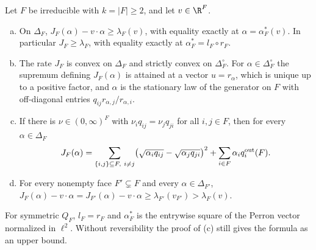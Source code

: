 \begin{proposition}\label{prop:rate}
Let $F$ be irreducible with $k=\lvert F\rvert\ge2$, and let $v\in\R^F$.
\begin{enumerate}[(a)]
\item On $\Delta_F$, $J_F(\alpha)-v\cdot\alpha\ge\lambda_F(v)$, with equality exactly at
$\alpha=\alpha^*_F(v)$. In particular $J_F\ge\lambda_F$, with equality exactly at
$\alpha^*_F=l_F\circ r_F$.
\item The rate $J_F$ is convex on $\Delta_F$ and strictly convex on $\Delta_F^\circ$. For
$\alpha\in\Delta_F^\circ$ the supremum defining $J_F(\alpha)$ is attained at a
vector $u=r_\alpha$, which is unique up to a positive factor, and $\alpha$ is
the stationary law of the generator on $F$ with off-diagonal entries
$q_{ij}r_{\alpha,j}/r_{\alpha,i}$.
\item If there is $\nu\in(0,\infty)^F$ with $\nu_iq_{ij}=\nu_jq_{ji}$ for all
$i,j\in F$, then for every $\alpha\in\Delta_F$
\[
 J_F(\alpha)=\sum_{\{i,j\}\subseteq F,\ i\ne j}\bigl(\sqrt{\alpha_iq_{ij}}-\sqrt{\alpha_jq_{ji}}\bigr)^2
 +\sum_{i\in F}\alpha_iq_i^{\rm out}(F).
\]
\item For every nonempty face $F'\subsetneq F$ and every
$\alpha\in\Delta_{F'}$, $J_F(\alpha)-v\cdot\alpha=J_{F'}(\alpha)-v\cdot\alpha\ge\lambda_{F'}(v_{F'})>\lambda_F(v)$.
\end{enumerate}
\end{proposition}

For symmetric $Q_F$, $l_F=r_F$ and $\alpha^*_F$ is the entrywise square of the
Perron vector normalized in $\ell^2$. Without reversibility the proof of (c)
still gives the formula as an upper bound.

